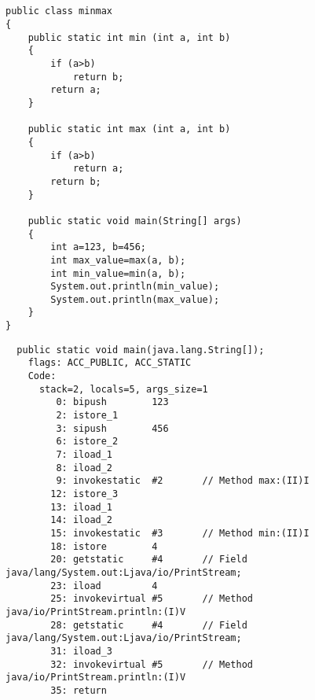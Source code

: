 \subsection{}


\begin{lstlisting}
public class minmax
{
	public static int min (int a, int b)
	{
		if (a>b)
			return b;
		return a;
	}

	public static int max (int a, int b)
	{
		if (a>b)
			return a;
		return b;
	}

	public static void main(String[] args)
	{
		int a=123, b=456;
		int max_value=max(a, b);
		int min_value=min(a, b);
		System.out.println(min_value);
		System.out.println(max_value);
	}
}
\end{lstlisting}


\begin{lstlisting}
  public static void main(java.lang.String[]);
    flags: ACC_PUBLIC, ACC_STATIC
    Code:
      stack=2, locals=5, args_size=1
         0: bipush        123
         2: istore_1      
         3: sipush        456
         6: istore_2      
         7: iload_1       
         8: iload_2       
         9: invokestatic  #2       // Method max:(II)I
        12: istore_3      
        13: iload_1       
        14: iload_2       
        15: invokestatic  #3       // Method min:(II)I
        18: istore        4
        20: getstatic     #4       // Field java/lang/System.out:Ljava/io/PrintStream;
        23: iload         4
        25: invokevirtual #5       // Method java/io/PrintStream.println:(I)V
        28: getstatic     #4       // Field java/lang/System.out:Ljava/io/PrintStream;
        31: iload_3       
        32: invokevirtual #5       // Method java/io/PrintStream.println:(I)V
        35: return        
\end{lstlisting}


